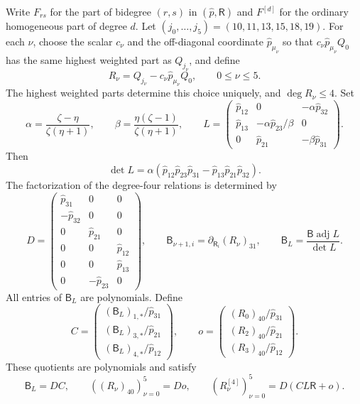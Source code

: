 \documentclass[11pt,a4paper]{article}
\numberwithin{equation}{section}
\theoremstyle{plain}
\theoremstyle{definition}
\theoremstyle{remark}
\begin{document}
Write $F_{rs}$ for the part of bidegree $(r,s)$ in
$(\widehat p,\mathsf R)$ and $F^{[d]}$ for the ordinary homogeneous
part of degree $d$. Let $(j_0,\ldots,j_5)=(10,11,13,15,18,19)$.
For each $\nu$, choose the scalar $c_\nu$ and the off-diagonal
coordinate $\widehat p_{\mu_\nu}$ so that
$c_\nu\widehat p_{\mu_\nu}Q_0$ has the same highest weighted
part as $Q_{j_\nu}$, and define
\[
 R_\nu=Q_{j_\nu}-c_\nu\widehat p_{\mu_\nu}Q_0,
 \qquad 0\le\nu\le5.
\]
The highest weighted parts determine this choice uniquely, and
$\deg R_\nu\le4$. Set
\[
 \alpha=\frac{\zeta-\eta}{\zeta(\eta+1)},\qquad
 \beta=\frac{\eta(\zeta-1)}{\zeta(\eta+1)},\qquad
 L=\begin{pmatrix}
 \widehat p_{12}&0&-\alpha\widehat p_{32}\\
 \widehat p_{13}&-\alpha\widehat p_{23}/\beta&0\\
 0&\widehat p_{21}&-\beta\widehat p_{31}
 \end{pmatrix}.
\]
Then
\[
 \det L=\alpha(\widehat p_{12}\widehat p_{23}\widehat p_{31}
                   -\widehat p_{13}\widehat p_{21}\widehat p_{32}).
\]
The factorization of the degree-four relations is determined by
\[
 D=\begin{pmatrix}
 \widehat p_{31}&0&0\\-\widehat p_{32}&0&0\\
 0&\widehat p_{21}&0\\0&0&\widehat p_{12}\\
 0&0&\widehat p_{13}\\0&-\widehat p_{23}&0
 \end{pmatrix},\qquad
 \mathsf B_{\nu+1,i}=\partial_{\mathsf R_i}(R_\nu)_{31},\qquad
 \mathsf B_L=\frac{\mathsf B\operatorname{adj}L}{\det L}.
\]
All entries of $\mathsf B_L$ are polynomials. Define
\[
 C=\begin{pmatrix}
 (\mathsf B_L)_{1,*}/\widehat p_{31}\\
 (\mathsf B_L)_{3,*}/\widehat p_{21}\\
 (\mathsf B_L)_{4,*}/\widehat p_{12}
 \end{pmatrix},\qquad
 o=\begin{pmatrix}
 (R_0)_{40}/\widehat p_{31}\\
 (R_2)_{40}/\widehat p_{21}\\
 (R_3)_{40}/\widehat p_{12}
 \end{pmatrix}.
\]
These quotients are polynomials and satisfy
\[
 \mathsf B_L=DC,\qquad
 ((R_\nu)_{40})_{\nu=0}^5=Do,\qquad
 (R^{[4]}_\nu)_{\nu=0}^5=D(CL\mathsf R+o).
\]
\end{document}
